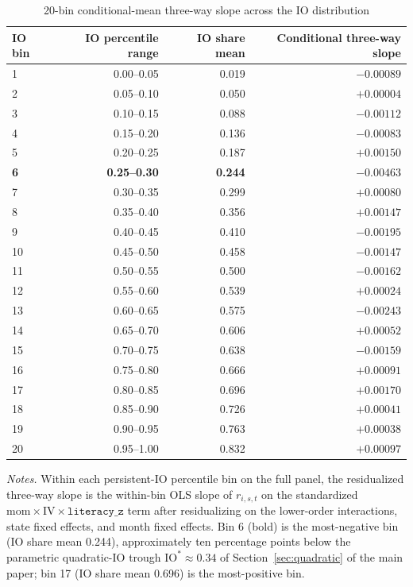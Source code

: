 \documentclass[12pt]{article}
\begin{document}
\begin{table}[h]
\centering
\caption{20-bin conditional-mean three-way slope across the IO distribution}
\footnotesize
\begin{tabular}{lrrr}
\toprule
IO bin & IO percentile range & IO share mean & Conditional three-way slope \\
\midrule
1 & 0.00--0.05 & 0.019 & $-0.00089$ \\
2 & 0.05--0.10 & 0.050 & $+0.00004$ \\
3 & 0.10--0.15 & 0.088 & $-0.00112$ \\
4 & 0.15--0.20 & 0.136 & $-0.00083$ \\
5 & 0.20--0.25 & 0.187 & $+0.00150$ \\
\textbf{6} & \textbf{0.25--0.30} & \textbf{0.244} & $\mathbf{-0.00463}$ \\
7 & 0.30--0.35 & 0.299 & $+0.00080$ \\
8 & 0.35--0.40 & 0.356 & $+0.00147$ \\
9 & 0.40--0.45 & 0.410 & $-0.00195$ \\
10 & 0.45--0.50 & 0.458 & $-0.00147$ \\
11 & 0.50--0.55 & 0.500 & $-0.00162$ \\
12 & 0.55--0.60 & 0.539 & $+0.00024$ \\
13 & 0.60--0.65 & 0.575 & $-0.00243$ \\
14 & 0.65--0.70 & 0.606 & $+0.00052$ \\
15 & 0.70--0.75 & 0.638 & $-0.00159$ \\
16 & 0.75--0.80 & 0.666 & $+0.00091$ \\
17 & 0.80--0.85 & 0.696 & $+0.00170$ \\
18 & 0.85--0.90 & 0.726 & $+0.00041$ \\
19 & 0.90--0.95 & 0.763 & $+0.00038$ \\
20 & 0.95--1.00 & 0.832 & $+0.00097$ \\
\bottomrule
\end{tabular}

\medskip
{\footnotesize\textit{Notes.} Within each persistent-IO percentile bin on the full panel, the residualized three-way slope is the within-bin OLS slope of $r_{i,s,t}$ on the standardized $\mathrm{mom}\times\mathrm{IV}\times\mathtt{literacy\_z}$ term after residualizing on the lower-order interactions, state fixed effects, and month fixed effects. Bin 6 (bold) is the most-negative bin (IO share mean 0.244), approximately ten percentage points below the parametric quadratic-IO trough $\mathrm{IO}^{\ast} \approx 0.34$ of Section~\ref{sec:quadratic} of the main paper; bin 17 (IO share mean 0.696) is the most-positive bin.}
\end{table}
\end{document}
